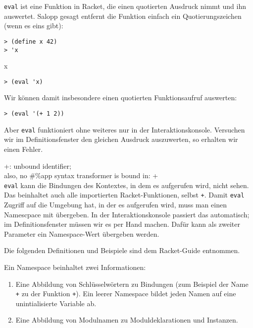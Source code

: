 \texttt{eval} ist eine Funktion in Racket, die einen quotierten Ausdruck nimmt und ihn auswertet. Salopp gesagt entfernt die Funktion einfach ein Quotierungszeichen (wenn es eins gibt):

\begin{lstlisting}
> (define x 42)
> 'x
\end{lstlisting}
{\rsymbol x}

\begin{lstlisting}
> (eval 'x)
\end{lstlisting}
{}

Wir können damit insbesondere einen quotierten Funktionsaufruf auswerten:

\begin{lstlisting}
> (eval '(+ 1 2))
\end{lstlisting}
{}

Aber \texttt{eval} funktioniert ohne weiteres nur in der Interaktionskonsole. Versuchen wir im Definitionsfenster den gleichen Ausdruck auszuwerten, so erhalten wir einen Fehler.

{\color{red}\ttfamily\small\hspace{5pt} +: unbound identifier;}\\
{\color{red}\ttfamily\small\hspace{5pt} also, no \#\%app syntax transformer is bound in: +}\\

\texttt{eval} kann die Bindungen des Kontextes, in dem es aufgerufen wird, nicht sehen. Das beinhaltet auch alle importierten Racket-Funktionen, selbst \texttt{+}. Damit \texttt{eval} Zugriff auf die Umgebung hat, in der es aufgerufen wird, muss man einen Namescpace mit übergeben. In der Interaktionskonsole passiert das automatisch; im Definitionsfenster müssen wir es per Hand machen. Dafür kann als zweiter Parameter ein Namespace-Wert übergeben werden. 

Die folgenden Definitionen und Beispiele sind dem Racket-Guide \cite{racketguide-namespace} entnommen.

Ein Namespace beinhaltet zwei Informationen:
\begin{enumerate}
 \item Eine Abbildung von Schlüsselwörtern zu Bindungen (zum Beispiel der Name \texttt{+} zu der Funktion \texttt{+}). Ein leerer Namespace bildet jeden Namen auf eine unintialisierte Variable ab.
 \item Eine Abbildung von Modulnamen zu Moduldeklarationen und Instanzen.
\end{enumerate}


